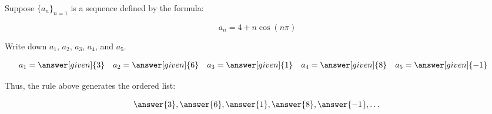 \documentclass{ximera}
\author{Jim Talamo}
\begin{document}
\begin{exercise}

Suppose $\{a_n\}_{n=1}$ is a sequence defined by the formula:

\[a_n = 4+n \cos(n \pi) \]

Write down $a_1$, $a_2$, $a_3$, $a_4$, and $a_5$.

    \begin{align*}
      a_1 &= \answer[given]{3} & 
      a_2 &= \answer[given]{6} & 
      a_3 &= \answer[given]{1} & 
      a_4 &= \answer[given]{8} & 
      a_5 &= \answer[given]{-1} 
    \end{align*}

\begin{exercise}    
Thus, the rule above generates the ordered list:

\[
\answer{3} ,\answer{6},\answer{1},\answer{8},\answer{-1}, \dots
\]   


\end{exercise}
\end{exercise}
\end{document}
